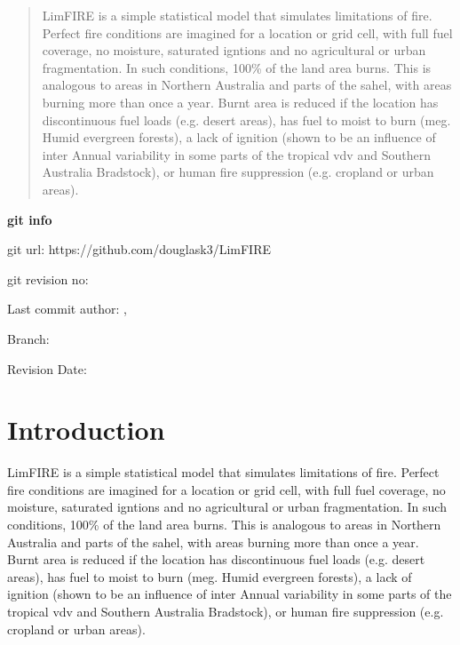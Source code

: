 \documentclass[12pt]{article}
\begin{document}
\maketitle

\begin{abstract}
LimFIRE is a simple statistical model that simulates limitations of fire. Perfect fire conditions are imagined for a location or grid cell, with full fuel coverage, no moisture, saturated igntions and no agricultural or urban fragmentation. In such conditions, 100\% of the land area burns. This is analogous to areas in Northern Australia and parts of the sahel, with areas burning more than once a year. Burnt area is reduced if the location has discontinuous fuel loads  (e.g. desert areas), has fuel to moist to burn (meg. Humid evergreen forests), a lack of ignition (shown to be an influence of inter Annual variability in some parts of the tropical vdv and Southern Australia Bradstock), or human fire suppression (e.g. cropland or urban areas).
\end{abstract}

\begin{center}
    \textbf{git info}

        git url: https://github.com/douglask3/LimFIRE
	
	git revision no: \gitAbbrevHash	

	Last commit author: \gitAuthorName,  \gitAuthorEmail
	
	Branch: \gitReferences	

	Revision Date: \gitAuthorIsoDate 
\end{center}

\section{Introduction}
LimFIRE is a simple statistical model that simulates limitations of fire. Perfect fire conditions are imagined for a location or grid cell, with full fuel coverage, no moisture, saturated igntions and no agricultural or urban fragmentation. In such conditions, 100\% of the land area burns. This is analogous to areas in Northern Australia and parts of the sahel, with areas burning more than once a year. Burnt area is reduced if the location has discontinuous fuel loads  (e.g. desert areas), has fuel to moist to burn (meg. Humid evergreen forests), a lack of ignition (shown to be an influence of inter Annual variability in some parts of the tropical vdv and Southern Australia Bradstock), or human fire suppression (e.g. cropland or urban areas).
\end{document}
